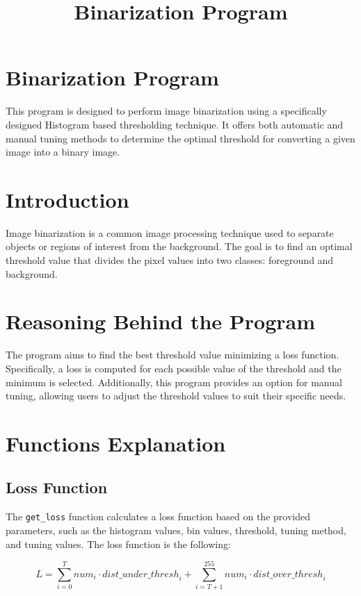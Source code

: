 \documentclass{article}
\title{Binarization Program}
\author{}
\date{}
\begin{document}
\maketitle

\section{Binarization Program}

This program is designed to perform image binarization using a specifically designed Histogram based thresholding technique. It offers both automatic and manual tuning methods to determine the optimal threshold for converting a given image into a binary image.

\section{Introduction}

Image binarization is a common image processing technique used to separate objects or regions of interest from the background. The goal is to find an optimal threshold value that divides the pixel values into two classes: foreground and background.

\section{Reasoning Behind the Program}

The program aims to find the best threshold value minimizing a loss function. Specifically, a loss is computed for each possible value of the threshold and the minimum is selected. Additionally, this program provides an option for manual tuning, allowing users to adjust the threshold values to suit their specific needs.

\section{Functions Explanation}

\subsection{Loss Function}

The \texttt{get\_loss} function calculates a loss function based on the provided parameters, such as the histogram values, bin values, threshold, tuning method, and tuning values. The loss function is the following:

$$
L = \sum_{i=0}^{T} {{num}}_{i} \cdot {{dist\_under\_thresh}}_{i} + \sum_{i=T+1}^{255} {{num}}_{i} \cdot {{dist\_over\_thresh}}_{i}
$$
\end{document}
